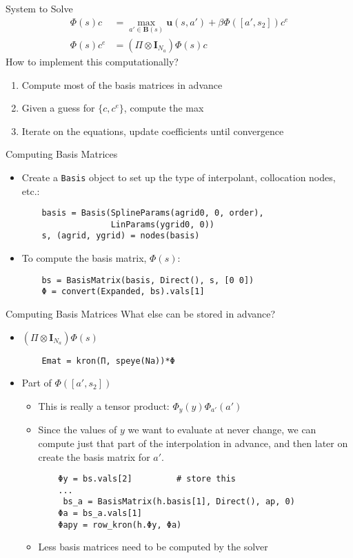 \documentclass{beamer}
\begin{document}
\begin{frame}{System to Solve}
\begin{align*}
\Phi(s)c &= \max_{a' \in \mathbf{B}(s)} \mathbf{u}(s, a') + \beta \Phi([a', s_2]) c^e \\
\Phi(s)c^e &= (\Pi \otimes \mathbf{I}_{N_a}) \Phi (s) c
\end{align*}
How to implement this computationally?
\begin{enumerate}
\item Compute most of the basis matrices in advance
\item Given a guess for $\{c, c^e \}$, compute the max
\item Iterate on the equations, update coefficients until convergence
\end{enumerate}
\end{frame}

\begin{frame}[fragile]{Computing Basis Matrices}
\begin{itemize}
\item Create a \texttt{Basis} object to set up the type of interpolant, collocation nodes, etc.: 
\begin{verbatim}    
    basis = Basis(SplineParams(agrid0, 0, order),
                  LinParams(ygrid0, 0))
    s, (agrid, ygrid) = nodes(basis)
\end{verbatim}
\item To compute the basis matrix, $\Phi(s)$:
\begin{verbatim}
    bs = BasisMatrix(basis, Direct(), s, [0 0])
    Φ = convert(Expanded, bs).vals[1]
\end{verbatim}
\end{itemize}
\end{frame}

\begin{frame}[fragile]{Computing Basis Matrices}
What else can be stored in advance?
\begin{itemize}
\item $(\Pi \otimes \mathbf{I}_{N_a}) \Phi (s)$
\begin{verbatim}
    Emat = kron(Π, speye(Na))*Φ
\end{verbatim}
\item Part of $\Phi([a', s_2])$
\begin{itemize}
\item This is really a tensor product: $\Phi_y(y) \Phi_{a'}(a')$
\item Since the values of $y$ we want to evaluate at never change, we can compute just that part of the interpolation in advance, and then later on create the basis matrix for $a'$.
\begin{verbatim}
    Φy = bs.vals[2]         # store this
    ...
     bs_a = BasisMatrix(h.basis[1], Direct(), ap, 0)
    Φa = bs_a.vals[1]
    Φapy = row_kron(h.Φy, Φa)
\end{verbatim}
\item Less basis matrices need to be computed by the solver
\end{itemize}
\end{itemize}
\end{frame}
\end{document}
